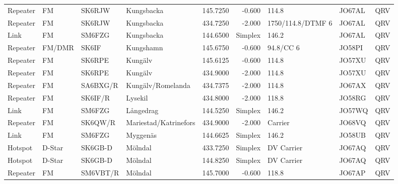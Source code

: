 {\begin{landscape}
\begin{longtable}{llllrrlll}
	Repeater          & FM              & SK6RJW   & Kungsbacka            &     145.7250 &     -0.600 & 114.8             & JO67AL      & QRV      \\
	Repeater          & FM              & SK6RJW   & Kungsbacka            &     434.7250 &     -2.000 & 1750/114.8/DTMF 6 & JO67AL      & QRV      \\
	Link              & FM              & SM6FZG   & Kungsbacka            &     144.6500 &    Simplex & 146.2             & JO67AL      & QRV      \\
	Repeater          & FM/DMR          & SK6IF    & Kungshamn             &     145.6750 &     -0.600 & 94.8/CC 6         & JO58PI      & QRV      \\
	Repeater          & FM              & SK6RPE   & Kungälv               &     145.6125 &     -0.600 & 114.8             & JO57XU      & QRV      \\
	Repeater          & FM              & SK6RPE   & Kungälv               &     434.9000 &     -2.000 & 114.8             & JO57XU      & QRV      \\
	Repeater          & FM              & SA6BXG/R & Kungälv/Romelanda     &     434.7375 &     -2.000 & 114.8             & JO67AX      & QRV      \\
	Repeater          & FM              & SK6IF/R  & Lysekil               &     434.8000 &     -2.000 & 118.8             & JO58RG      & QRV      \\
	Link              & FM              & SM6FZG   & Långedrag             &     144.5250 &    Simplex & 146.2             & JO57WQ      & QRV      \\
	Repeater          & FM              & SK6QW/R  & Mariestad/Katrinefors &     434.9000 &     -2.000 & Carrier           & JO68VQ      & QRV      \\
	Link              & FM              & SM6FZG   & Myggenäs              &     144.6625 &    Simplex & 146.2             & JO58UB      & QRV      \\
	Hotspot           & D-Star          & SK6GB-D  & Mölndal               &     433.7250 &    Simplex & DV Carrier        & JO67AQ      & QRV      \\
	Hotspot           & D-Star          & SK6GB-D  & Mölndal               &     144.8250 &    Simplex & DV Carrier        & JO67AQ      & QRV      \\
	Repeater          & FM              & SM6VBT/R & Mölndal               &     145.7000 &     -0.600 & 118.8             & JO67AP      & QRV      \\

\end{longtable}
\end{landscape}}
